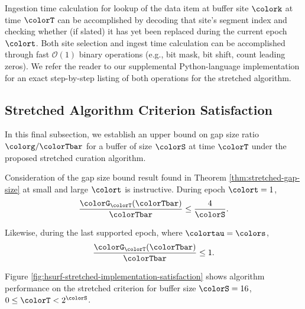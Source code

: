 Ingestion time calculation for lookup of the data item at buffer site $\colork$ at time $\colorT$ can be accomplished by decoding that site's segment index and checking whether (if slated) it has yet been replaced during the current epoch $\colort$.
Both site selection and ingest time calculation can be accomplished through fast $\mathcal{O}(1)$ binary operations (e.g., bit mask, bit shift, count leading zeros).
We refer the reader to our supplemental Python-language implementation for an exact step-by-step listing of both operations for the stretched algorithm.

\subsection{Stretched Algorithm Criterion Satisfaction}
\label{sec:stretched-satisfaction}

In this final subsection, we establish an upper bound on gap size ratio $\colorg / \colorTbar$ for a buffer of size $\colorS$ at time $\colorT$ under the proposed stretched curation algorithm.



Consideration of the gap size bound result found in Theorem \ref{thm:stretched-gap-size} at small and large $\colort$ is instructive.
During epoch $\colort = 1$,
\begin{align*}
\frac{\colorG_{\colorT}(\colorTbar)}{\colorTbar}
\leq
\frac{4}{\colorS}.
\end{align*}

Likewise, during the last supported epoch, where $\colortau = \colors$,
\begin{align*}
\frac{\colorG_{\colorT}(\colorTbar)}{\colorTbar}
\leq
1.
\end{align*}

Figure \ref{fig:hsurf-stretched-implementation-satisfaction} shows algorithm performance on the stretched criterion for buffer size $\colorS=16$, $0 \leq \colorT < 2^{\colorS}$.



